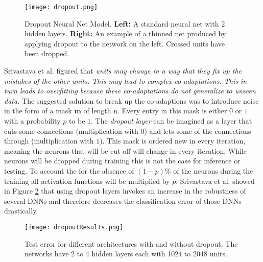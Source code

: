  \begin{figure}
\centering
  \texttt{[image: dropout.png]}
  \caption{Dropout Neural Net Model. \textbf{Left:} A standard neural net with 2 hidden layers. \textbf{Right:}
An example of a thinned net produced by applying dropout to the network on the left.
Crossed units have been dropped. \cite{JMLR:v15:srivastava14a}
}\label{fig:dropout}
\end{figure}

Srivastava et al. figured that \emph{units may change in a way that they fix up the mistakes of the other units. This may lead to complex co-adaptations. This in turn leads to overfitting because these co-adaptations do not generalize to unseen data.}\cite{JMLR:v15:srivastava14a}
The suggested solution to break up the co-adaptions was to introduce noise in the form of a mask $\mathbf{m}$ of length n.
Every entry in this mask is either $0$ or $1$ with a probability $p$ to be $1$.
The \emph{dropout layer} can be imagined as a layer that cuts some connections (multiplication with $0$) and lets some of the connections through (multiplication with $1$). 
This mask is ordered new in every iteration, meaning the neurons that will be cut off will change in every iteration.
While neurons will be dropped during training this is not the case for inference or testing. To account the for the absence of $(1-p)\%$ of the neurons during the training all activation functions will be multiplied by $p$.
Srivastava et al. showed in Figure \ref{fig:dropoutResults} that using dropout layers invokes an increase in the robustness of several DNNs and therefore decreases the classification error of those DNNs drastically.

 \begin{figure}
\centering
  \texttt{[image: dropoutResults.png]}
  \caption{Test error for different architectures
with and without dropout. The networks have 2 to 4 hidden layers each
with 1024 to 2048 units. \cite{JMLR:v15:srivastava14a}
}\label{fig:dropoutResults}
\end{figure}

